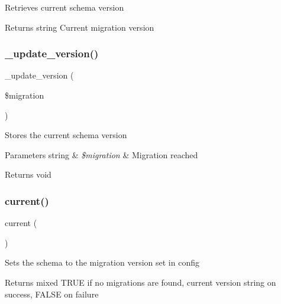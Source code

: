 Retrieves current schema version

\begin{DoxyReturn}{Returns}
string Current migration version 
\end{DoxyReturn}
\mbox{\label{class_c_i___migration_a6eb30e31b93e1cf882527be723d52fcd}} 
\subsubsection{\texorpdfstring{\+\_\+update\+\_\+version()}{\_update\_version()}}
{\footnotesize\ttfamily \+\_\+update\+\_\+version (\begin{DoxyParamCaption}\item[{}]{\$migration }\end{DoxyParamCaption})\hspace{0.3cm}{\ttfamily [protected]}}

Stores the current schema version


\begin{DoxyParams}[1]{Parameters}
string & {\em \$migration} & Migration reached \\
\hline
\end{DoxyParams}
\begin{DoxyReturn}{Returns}
void 
\end{DoxyReturn}
\mbox{\label{class_c_i___migration_af343507d1926e6ecf964625d41db528c}} 
\subsubsection{\texorpdfstring{current()}{current()}}
{\footnotesize\ttfamily current (\begin{DoxyParamCaption}{ }\end{DoxyParamCaption})}

Sets the schema to the migration version set in config

\begin{DoxyReturn}{Returns}
mixed T\+R\+UE if no migrations are found, current version string on success, F\+A\+L\+SE on failure 
\end{DoxyReturn}
\mbox{\label{class_c_i___migration_aad434fa9bec99e30d6a86beb5c2607df}} 
